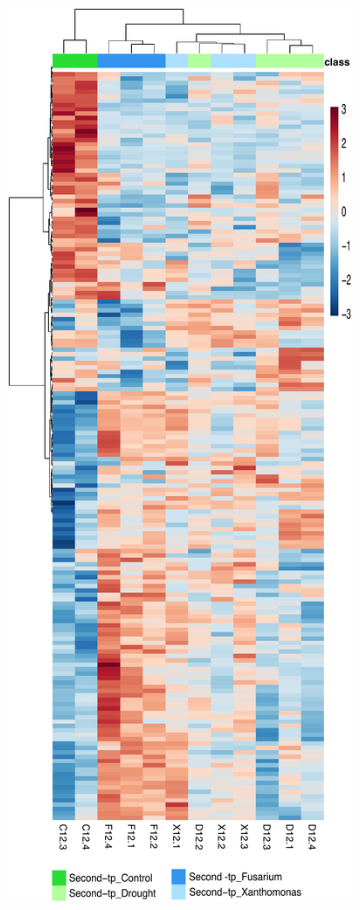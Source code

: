 \begin{figure}[!hptb]
    \centering
    \begin{subfigure}[b]{0.42\textwidth}
        \includegraphics[width=\textwidth]{Figures/heatmapofsigfeatures-ForThesis-Long.pdf}

\end{subfigure}
\end{figure}
